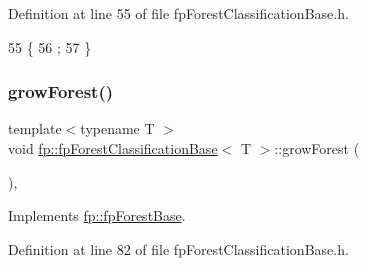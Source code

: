 Definition at line 55 of file fp\+Forest\+Classification\+Base.\+h.


\begin{DoxyCode}
55                                          \{
56                 ;
57             \}
\end{DoxyCode}
\mbox{\label{classfp_1_1fpForestClassificationBase_a706225fdbef8c71fb022f4c3446b388d}} 
\subsubsection{\texorpdfstring{grow\+Forest()}{growForest()}}
{\footnotesize\ttfamily template$<$typename T $>$ \\
void \hyperlink{classfp_1_1fpForestClassificationBase}{fp\+::fp\+Forest\+Classification\+Base}$<$ T $>$\+::grow\+Forest (\begin{DoxyParamCaption}{ }\end{DoxyParamCaption})\hspace{0.3cm}{\ttfamily [inline]}, {\ttfamily [virtual]}}



Implements \hyperlink{classfp_1_1fpForestBase_a05b1d924a559536083ee7a8cf3ea542d}{fp\+::fp\+Forest\+Base}.



Definition at line 82 of file fp\+Forest\+Classification\+Base.\+h.


